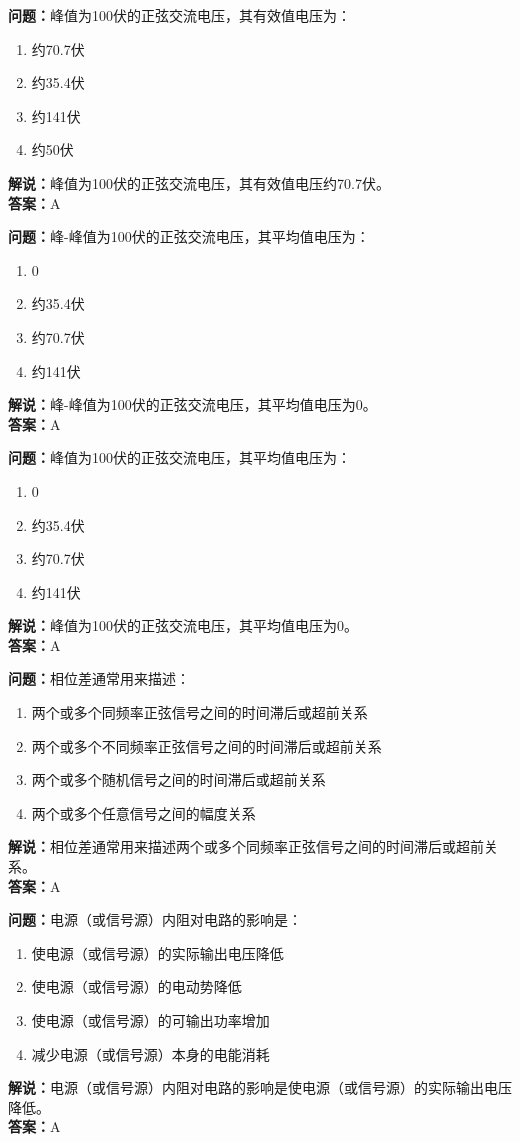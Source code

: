 \documentclass[UTF8]{ctexbook}
\begin{document}
\textbf{问题：}峰值为100伏的正弦交流电压，其有效值电压为：
\begin{enumerate}[label=\Alph*), leftmargin=3em]
  \item 约70.7伏
  \item 约35.4伏
  \item 约141伏
  \item 约50伏
\end{enumerate}
\textbf{解说：}峰值为100伏的正弦交流电压，其有效值电压约70.7伏。\\
\textbf{答案：}A

\textbf{问题：}峰-峰值为100伏的正弦交流电压，其平均值电压为：
\begin{enumerate}[label=\Alph*), leftmargin=3em]
  \item 0
  \item 约35.4伏
  \item 约70.7伏
  \item 约141伏
\end{enumerate}
\textbf{解说：}峰-峰值为100伏的正弦交流电压，其平均值电压为0。\\
\textbf{答案：}A

\textbf{问题：}峰值为100伏的正弦交流电压，其平均值电压为：
\begin{enumerate}[label=\Alph*), leftmargin=3em]
  \item 0
  \item 约35.4伏
  \item 约70.7伏
  \item 约141伏
\end{enumerate}
\textbf{解说：}峰值为100伏的正弦交流电压，其平均值电压为0。\\
\textbf{答案：}A

\textbf{问题：}相位差通常用来描述：
\begin{enumerate}[label=\Alph*), leftmargin=3em]
  \item 两个或多个同频率正弦信号之间的时间滞后或超前关系
  \item 两个或多个不同频率正弦信号之间的时间滞后或超前关系
  \item 两个或多个随机信号之间的时间滞后或超前关系
  \item 两个或多个任意信号之间的幅度关系
\end{enumerate}
\textbf{解说：}相位差通常用来描述两个或多个同频率正弦信号之间的时间滞后或超前关系。\\
\textbf{答案：}A

\textbf{问题：}电源（或信号源）内阻对电路的影响是：
\begin{enumerate}[label=\Alph*), leftmargin=3em]
  \item 使电源（或信号源）的实际输出电压降低
  \item 使电源（或信号源）的电动势降低
  \item 使电源（或信号源）的可输出功率增加
  \item 减少电源（或信号源）本身的电能消耗
\end{enumerate}
\textbf{解说：}电源（或信号源）内阻对电路的影响是使电源（或信号源）的实际输出电压降低。\\
\textbf{答案：}A
\end{document}
